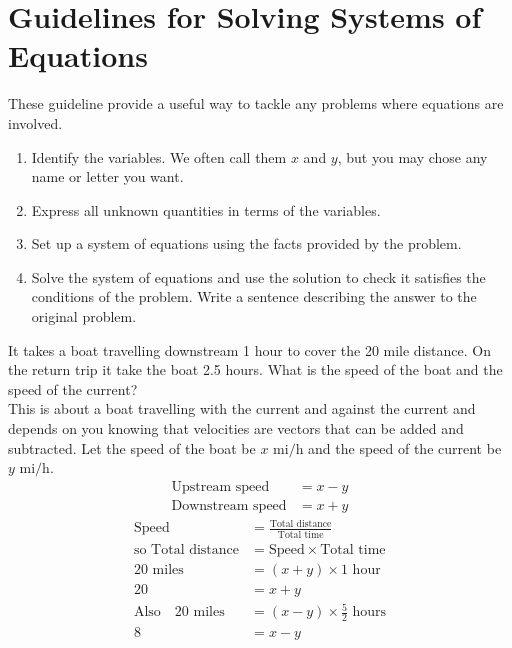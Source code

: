 \section*{Guidelines for Solving Systems of Equations}
 These guideline provide a useful way to tackle any problems where equations are involved. 
 \begin{tcolorbox}
 	
  \begin{enumerate}\setlength\itemsep{0em}
 	\item Identify the variables. We often call them $x$ and $y$, but you may chose any name or letter you want. 	
 	\item Express all unknown quantities in terms of the variables. 	
 	\item Set up a system of equations using the facts provided by the problem.	
 	\item Solve the system of equations and use the solution to check it satisfies the conditions of the
 	problem. Write a sentence describing the answer to the original problem.  
 \end{enumerate}
\end{tcolorbox}
 \clearpage
 \example It takes a boat travelling downstream 1 hour to cover the 20 mile distance. On the return trip it take the boat 2.5 hours. What is the speed of the boat and the speed of the current?\medskip\\
 \solution This is about a boat travelling with the current and against the current and depends on you knowing that velocities are vectors that can be added and subtracted. Let the speed of the boat be $x$ \mbox{mi}$/$\mbox{h} and the speed of the current be $y$ \mbox{mi}$/$\mbox{h}. 
 	\begin{align*}\text{Upstream speed} &  =  x -y \\
 	\text{Downstream speed} &  =  x +y\end{align*}
 	\begin{align}\text{Speed} &  =  \frac{\text{Total distance}}{\text{Total time}} \nonumber  \\
 	\text{so Total distance} &  =  \text{Speed} \times \text{Total time} \nonumber  \\
 	20 \textrm{ miles } &  =  \left (x +y\right ) \times 1 \textrm{ hour} \nonumber  \\
 	20 &=x +y \tag{1} \\
 	\text{Also}\quad 20 \textrm{ miles }&  =  \left (x -y\right ) \times \frac{5}{2} \textrm{ hours}\nonumber  \\
 	8 &=x -y \tag{2}\end{align}
